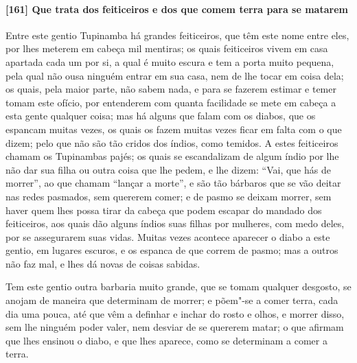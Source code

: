 \paragraph{[161] Que trata dos feiticeiros e dos que comem terra para se matarem}\quad
Entre este gentio Tupinamba há grandes feiticeiros, que têm este nome entre eles, por lhes
meterem em cabeça mil mentiras; os quais feiticeiros vivem em casa apartada cada um por
si, a qual é muito escura e tem a porta muito pequena, pela qual não ousa ninguém entrar
em sua casa, nem de lhe tocar em coisa dela; os quais, pela maior parte, não sabem nada, e
para se fazerem estimar e temer tomam este ofício, por entenderem com quanta facilidade se
mete em cabeça a esta gente qualquer coisa; mas há alguns que falam com os diabos, que os
espancam muitas vezes, os quais os fazem muitas vezes ficar em falta com o que dizem; pelo
que não são tão cridos dos índios, como temidos. A estes feiticeiros chamam os Tupinambas
pajés; os quais se escandalizam de algum índio por lhe não dar sua filha ou outra coisa
que lhe pedem, e lhe dizem: ``Vai, que hás de morrer'', ao que chamam ``lançar a morte'',
e são tão bárbaros que se vão deitar nas redes pasmados, sem quererem comer; e de pasmo se
deixam morrer, sem haver quem lhes possa tirar da cabeça que podem escapar do mandado dos
feiticeiros, aos quais dão alguns índios suas filhas por mulheres, com medo deles, por se
assegurarem suas vidas. Muitas vezes acontece aparecer o diabo a este gentio, em lugares
escuros, e os espanca de que correm de pasmo; mas a outros não faz mal, e lhes dá novas de
coisas sabidas.

Tem este gentio outra barbaria muito grande, que se tomam qualquer desgosto, se anojam de
maneira que determinam de morrer; e põem"-se a comer terra, cada dia uma pouca, até que vêm
a definhar e inchar do rosto e olhos, e morrer disso, sem lhe ninguém poder valer, nem
desviar de se quererem matar; o que afirmam que lhes ensinou o diabo, e que lhes aparece,
como se determinam a comer a terra.


